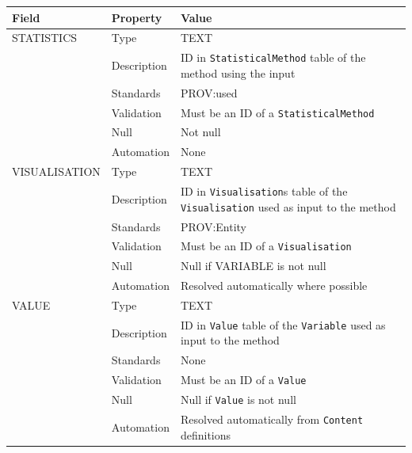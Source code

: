 \documentclass[
]{article}
\newcounter{none}
\begin{document}
{\def\LTcaptype{none} 
\begin{longtable}[]{@{}
  >{\raggedright\arraybackslash}p{}
  >{\raggedright\arraybackslash}p{}
  >{\raggedright\arraybackslash}p{}@{}}
\toprule\noalign{}
\begin{minipage}[b]{\linewidth}\raggedright
Field
\end{minipage} & \begin{minipage}[b]{\linewidth}\raggedright
Property
\end{minipage} & \begin{minipage}[b]{\linewidth}\raggedright
Value
\end{minipage} \\
\midrule\noalign{}
\endhead
\bottomrule\noalign{}
\endlastfoot
STATISTICS & Type & TEXT \\
& Description & ID in \texttt{StatisticalMethod} table of the method
using the input \\
& Standards & PROV:used \\
& Validation & Must be an ID of a \texttt{StatisticalMethod} \\
& Null & Not null \\
& Automation & None \\
VISUALISATION & Type & TEXT \\
& Description & ID in \texttt{Visualisation}s table of the
\texttt{Visualisation} used as input to the method \\
& Standards & PROV:Entity \\
& Validation & Must be an ID of a \texttt{Visualisation} \\
& Null & Null if VARIABLE is not null \\
& Automation & Resolved automatically where possible \\
VALUE & Type & TEXT \\
& Description & ID in \texttt{Value} table of the \texttt{Variable} used
as input to the method \\
& Standards & None \\
& Validation & Must be an ID of a \texttt{Value} \\
& Null & Null if \texttt{Value} is not null \\
& Automation & Resolved automatically from \texttt{Content}
definitions \\
\end{longtable}
}
\end{document}
